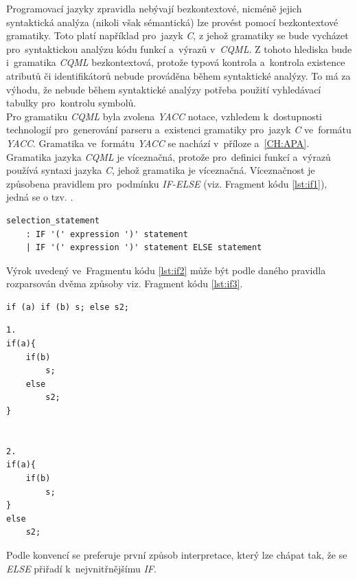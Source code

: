 \documentclass[11pt,twoside,a4paper]{book}
\begin{document}
Programovací jazyky zpravidla nebývají bezkontextové, nicméně jejich syntaktická analýza (nikoli však sémantická) lze provést pomocí bezkontextové gramatiky. Toto platí například pro~jazyk \textit{C}, z jehož gramatiky se bude vycházet pro~syntaktickou analýzu kódu funkcí a~výrazů v~\textit{CQML}. Z tohoto hlediska bude i~gramatika \textit{CQML} bezkontextová, protože typová kontrola a~kontrola existence atributů či identifikátorů nebude prováděna během syntaktické analýzy. To má za výhodu, že nebude během syntaktické analýzy potřeba použití vyhledávací tabulky pro~kontrolu symbolů.\\
Pro gramatiku \textit{CQML} byla zvolena \textit{YACC} notace, vzhledem k~dostupnosti technologií pro~generování parseru a~existenci gramatiky pro~jazyk \textit{C} ve~formátu \textit{YACC}. Gramatika ve~formátu \textit{YACC} se nachází v~příloze a~\ref{CH:APA}.\\
Gramatika jazyka \textit{CQML} je víceznačná, protože pro~definici funkcí a~výrazů používá syntaxi jazyka \textit{C}, jehož gramatika je víceznačná. Víceznačnost je způsobena pravidlem pro~podmínku \textit{IF-ELSE} (viz. Fragment kódu \ref{lst:if1}), jedná se o tzv. .\\
\begin{lstlisting}[frame=single,caption=Víceznačné \textit{IF-ELSE} pravidlo gramatiky.,label=lst:if1]
selection_statement
	: IF '(' expression ')' statement
	| IF '(' expression ')' statement ELSE statement 
\end{lstlisting}
Výrok uvedený ve~Fragmentu kódu \ref{lst:if2} může být podle daného pravidla rozparsován dvěma způsoby viz. Fragment kódu \ref{lst:if3}.
\begin{lstlisting}[frame=single,caption=Příklad víceznačného výroku \textit{IF}-\textit{ELSE},label=lst:if2]
if (a) if (b) s; else s2;
\end{lstlisting}

\begin{lstlisting}[float,frame=single,caption=Možnosti interpretace víceznačného výroku \textit{IF}-\textit{ELSE},label=lst:if3]
1.
if(a){
	if(b)
		s;
	else
		s2;
}


2.
if(a){
	if(b)
		s;
}
else
	s2;
\end{lstlisting}
Podle konvencí se preferuje první způsob interpretace, který lze chápat tak, že se \textit{ELSE} přiřadí k~nejvnitřnějšímu \textit{IF}.
\end{document}
